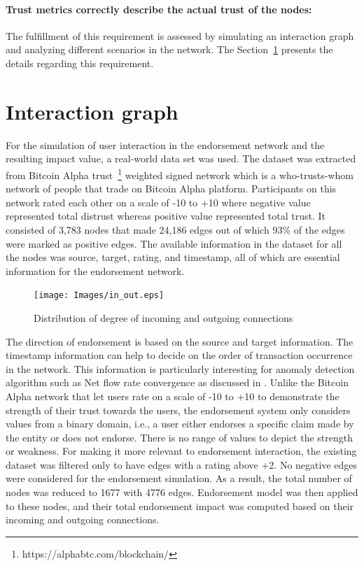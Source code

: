 \paragraph{Trust metrics correctly describe the actual trust of the nodes:}The
fulfillment of this requirement is assessed by simulating an interaction graph
and analyzing different scenarios in the network. The
Section~\ref{sec:interaction} presents the details regarding this requirement. 
\section{Interaction graph} \label{sec:interaction}
For the simulation of user interaction in the endorsement network and the
resulting impact value, a real-world data set was used. The dataset was
extracted from Bitcoin Alpha trust~\footnote{https://alphabtc.com/blockchain/}
weighted signed network which is a who-trusts-whom network of people that trade
on Bitcoin Alpha platform. Participants on this network rated each other on a
scale of -10 to +10 where negative value represented total distrust whereas
positive value represented total trust. It consisted of 3,783 nodes that made
24,186 edges out of which 93\% of the edges were marked as positive
edges\cite{kumar2016edge}.  The available information in the dataset for all
the nodes was source, target, rating, and timestamp, all of which are essential
information for the endorsement network. 
\begin{figure}
	\texttt{[image: Images/in\_out.eps]} 
	\caption{Distribution of degree of incoming and outgoing connections} 
	\label{inOut}
\end{figure}
The direction of endorsement is based on the source and target information.
The timestamp information can help to decide on the order of transaction
occurrence in the network. This information is particularly interesting for
anomaly detection algorithm such as Net flow rate convergence as discussed in
\cite{buechler2015decentralized}. Unlike the Bitcoin Alpha network that let
users rate on a scale of -10 to +10 to demonstrate the strength of their trust
towards the users, the endorsement system only considers values from a binary
domain, i.e., a user either endorses a specific claim made by the entity or
does not endorse. There is no range of values to depict the strength or
weakness. For making it more relevant to endorsement interaction, the existing
dataset was filtered only to have edges with a rating above +2. No negative
edges were considered for the endorsement simulation. As a result, the total
number of nodes was reduced to 1677 with 4776 edges. Endorsement model was then
applied to these nodes, and their total endorsement impact was computed based
on their incoming and outgoing connections. 

